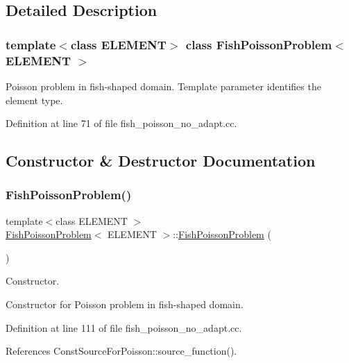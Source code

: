 \subsection{Detailed Description}
\subsubsection*{template$<$class E\+L\+E\+M\+E\+NT$>$\newline
class Fish\+Poisson\+Problem$<$ E\+L\+E\+M\+E\+N\+T $>$}

Poisson problem in fish-\/shaped domain. Template parameter identifies the element type. 

Definition at line 71 of file fish\+\_\+poisson\+\_\+no\+\_\+adapt.\+cc.



\subsection{Constructor \& Destructor Documentation}
\mbox{\label{classFishPoissonProblem_ab283ed2dc6985c2871afb09d96b0cff0}} 
\subsubsection{\texorpdfstring{Fish\+Poisson\+Problem()}{FishPoissonProblem()}}
{\footnotesize\ttfamily template$<$class E\+L\+E\+M\+E\+NT $>$ \\
\hyperlink{classFishPoissonProblem}{Fish\+Poisson\+Problem}$<$ E\+L\+E\+M\+E\+NT $>$\+::\hyperlink{classFishPoissonProblem}{Fish\+Poisson\+Problem} (\begin{DoxyParamCaption}{ }\end{DoxyParamCaption})}



Constructor. 

Constructor for Poisson problem in fish-\/shaped domain. 

Definition at line 111 of file fish\+\_\+poisson\+\_\+no\+\_\+adapt.\+cc.



References Const\+Source\+For\+Poisson\+::source\+\_\+function().

\mbox{\label{classFishPoissonProblem_ad4e0b221af80c3bcc77badc40657a385}} 
